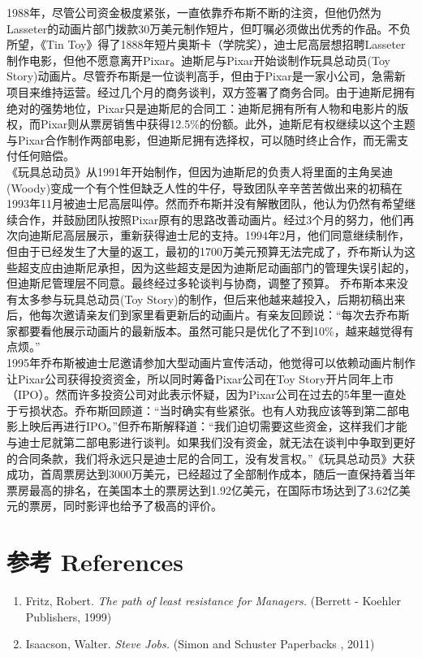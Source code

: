 1988年，尽管公司资金极度紧张，一直依靠乔布斯不断的注资，但他仍然为Lasseter的动画片部门拨款30万美元制作短片，但叮嘱必须做出优秀的作品。不负所望，《Tin
Toy》得了1888年短片奥斯卡（学院奖），迪士尼高层想招聘Lasseter制作电影，但他不愿意离开Pixar。迪斯尼与Pixar开始谈制作玩具总动员(Toy
Story)动画片。尽管乔布斯是一位谈判高手，但由于Pixar是一家小公司，急需新项目来维持运营。经过几个月的商务谈判，双方签署了商务合同。由于迪斯尼拥有绝对的强势地位，Pixar只是迪斯尼的合同工：迪斯尼拥有所有人物和电影片的版权，而Pixar则从票房销售中获得12.5\%的份额。此外，迪斯尼有权继续以这个主题与Pixar合作制作两部电影，但迪斯尼拥有选择权，可以随时终止合作，而无需支付任何赔偿。\\
《玩具总动员》从1991年开始制作，但因为迪斯尼的负责人将里面的主角吴迪(Woody)变成一个有个性但缺乏人性的牛仔，导致团队辛辛苦苦做出来的初稿在1993年11月被迪士尼高层叫停。然而乔布斯并没有解散团队，他认为仍然有希望继续合作，并鼓励团队按照Pixar原有的思路改善动画片。经过3个月的努力，他们再次向迪斯尼高层展示，重新获得迪士尼的支持。1994年2月，他们同意继续制作，但由于已经发生了大量的返工，最初的1700万美元预算无法完成了，乔布斯认为这些超支应由迪斯尼承担，因为这些超支是因为迪斯尼动画部门的管理失误引起的，但迪斯尼管理层不同意。最终经过多轮谈判与协商，调整了预算。
乔布斯本来没有太多参与玩具总动员(Toy
Story)的制作，但后来他越来越投入，后期初稿出来后，他每次邀请亲友们到家里看更新后的动画片。有亲友回顾说：``每次去乔布斯家都要看他展示动画片的最新版本。虽然可能只是优化了不到10\%，越来越觉得有点烦。''\\
1995年乔布斯被迪士尼邀请参加大型动画片宣传活动，他觉得可以依赖动画片制作让Pixar公司获得投资资金，所以同时筹备Pixar公司在Toy
Story开片同年上市（IPO）。然而许多投资公司对此表示怀疑，因为Pixar公司在过去的5年里一直处于亏损状态。乔布斯回顾道：``当时确实有些紧张。也有人劝我应该等到第二部电影上映后再进行IPO。''但乔布斯解释道：``我们迫切需要这些资金，这样我们才能与迪士尼就第二部电影进行谈判。如果我们没有资金，就无法在谈判中争取到更好的合同条款，我们将永远只是迪士尼的合同工，没有发言权。''《玩具总动员》大获成功，首周票房达到3000万美元，已经超过了全部制作成本，随后一直保持着当年票房最高的排名，在美国本土的票房达到1.92亿美元，在国际市场达到了3.62亿美元的票房，同时影评也给予了极高的评价。

\hypertarget{ux53c2ux8003-references}{%
\section{参考 References}\label{ux53c2ux8003-references}}

\begin{enumerate}
\tightlist
\item
  Fritz, Robert. \emph{The path of least resistance for Managers.}
  (Berrett - Koehler Publishers, 1999)\\
\item
  Isaacson, Walter. \emph{Steve Jobs.} (Simon and Schuster Paperbacks ,
  2011)\\
\end{enumerate}




